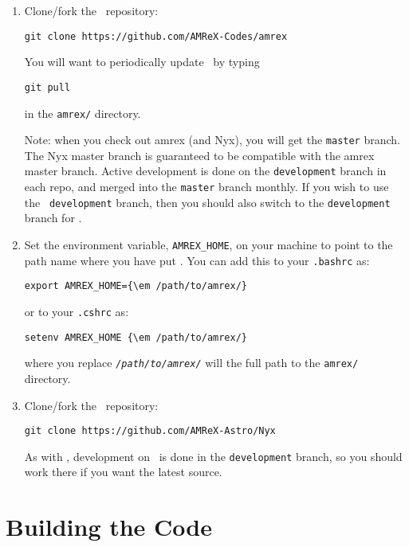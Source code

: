 \begin{enumerate}

\item Clone/fork the \amrex\ repository:
\begin{verbatim}
git clone https://github.com/AMReX-Codes/amrex
\end{verbatim}

You will want to periodically update \amrex\ by typing
\begin{verbatim}
git pull
\end{verbatim}
in the {\tt amrex/} directory.

Note: when you check out amrex (and Nyx), you will get the {\tt master}
branch.   The Nyx master branch is guaranteed to be compatible
with the amrex master branch.
Active development is done on the {\tt development} branch
in each repo, and merged into the {\tt master} branch monthly.
If you wish to use the \nyx\ {\tt development} branch, then you
should also switch to the {\tt development} branch for \amrex.

\item Set the environment variable, {\tt AMREX\_HOME}, on your
  machine to point to the path name where you have put \amrex.
  You can add this to your {\tt .bashrc} as:
\begin{Verbatim}[commandchars=\\\{\}]
export AMREX_HOME={\em /path/to/amrex/}
\end{Verbatim}
or to your {\tt .cshrc} as:
\begin{Verbatim}[commandchars=\\\{\}]
setenv AMREX_HOME {\em /path/to/amrex/}
\end{Verbatim}
where you replace \texttt{\em /path/to/amrex/} will the full path to the
{\tt amrex/} directory.

\item Clone/fork the \nyx\ repository:
\begin{verbatim}
git clone https://github.com/AMReX-Astro/Nyx
\end{verbatim}

As with \amrex, development on \nyx\ is done in the
{\tt development} branch, so you should work there if you want
the latest source.

\end{enumerate}

\section{Building the Code}

